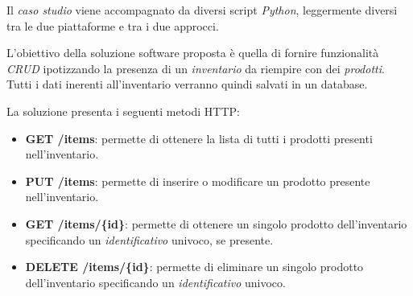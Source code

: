 Il \textit{caso studio} viene accompagnato da diversi script \textit{Python}, leggermente diversi tra le due piattaforme e tra i due approcci.

L'obiettivo della soluzione software proposta è quella di fornire funzionalità \textit{CRUD} ipotizzando la presenza di un \textit{inventario} da riempire con dei \textit{prodotti}. Tutti i dati inerenti all'inventario verranno quindi salvati in un database.

La soluzione presenta i seguenti metodi HTTP:
\begin{itemize}
    \item \textbf{GET /items}: permette di ottenere la lista di tutti i prodotti presenti nell'inventario.
    \item \textbf{PUT /items}: permette di inserire o modificare un prodotto presente nell'inventario.
    \item \textbf{GET /items/\{id\}}: permette di ottenere un singolo prodotto dell'inventario specificando un \textit{identificativo} univoco, se presente.
    \item \textbf{DELETE /items/\{id\}}: permette di eliminare un singolo prodotto dell'inventario specificando un \textit{identificativo} univoco.
\end{itemize}